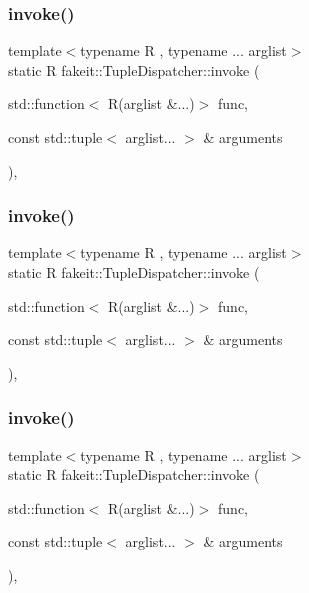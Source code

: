 \subsubsection{\texorpdfstring{invoke()}{invoke()}\hspace{0.1cm}{\footnotesize\ttfamily [2/9]}}
{\footnotesize\ttfamily template$<$typename R , typename ... arglist$>$ \\
static R fakeit\+::\+Tuple\+Dispatcher\+::invoke (\begin{DoxyParamCaption}\item[{std\+::function$<$ R(arglist \&...)$>$}]{func,  }\item[{const std\+::tuple$<$ arglist... $>$ \&}]{arguments }\end{DoxyParamCaption})\hspace{0.3cm}{\ttfamily [inline]}, {\ttfamily [static]}}

\mbox{\label{structfakeit_1_1TupleDispatcher_a279619fd6d6649c4d99c459a3286469a}} 
\subsubsection{\texorpdfstring{invoke()}{invoke()}\hspace{0.1cm}{\footnotesize\ttfamily [3/9]}}
{\footnotesize\ttfamily template$<$typename R , typename ... arglist$>$ \\
static R fakeit\+::\+Tuple\+Dispatcher\+::invoke (\begin{DoxyParamCaption}\item[{std\+::function$<$ R(arglist \&...)$>$}]{func,  }\item[{const std\+::tuple$<$ arglist... $>$ \&}]{arguments }\end{DoxyParamCaption})\hspace{0.3cm}{\ttfamily [inline]}, {\ttfamily [static]}}

\mbox{\label{structfakeit_1_1TupleDispatcher_a279619fd6d6649c4d99c459a3286469a}} 
\subsubsection{\texorpdfstring{invoke()}{invoke()}\hspace{0.1cm}{\footnotesize\ttfamily [4/9]}}
{\footnotesize\ttfamily template$<$typename R , typename ... arglist$>$ \\
static R fakeit\+::\+Tuple\+Dispatcher\+::invoke (\begin{DoxyParamCaption}\item[{std\+::function$<$ R(arglist \&...)$>$}]{func,  }\item[{const std\+::tuple$<$ arglist... $>$ \&}]{arguments }\end{DoxyParamCaption})\hspace{0.3cm}{\ttfamily [inline]}, {\ttfamily [static]}}

